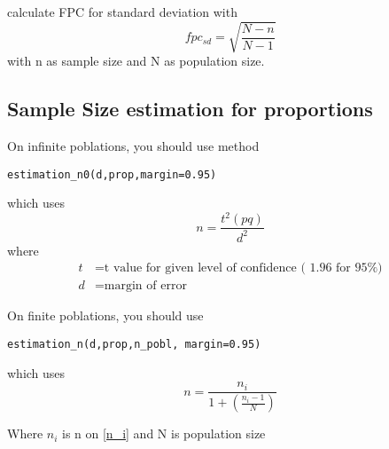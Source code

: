 calculate FPC for standard deviation with 
\begin{equation}
fpc_{sd} = \sqrt{\frac{N-n} {N-1}}
\label{fpc}
\end{equation}
with n  as sample size and N as population size.

\subsection{Sample Size estimation for proportions}

On infinite poblations, you should use method
\begin{verbatim}
estimation_n0(d,prop,margin=0.95)
\end{verbatim}
which uses
\begin{equation}
n = \frac{t^2(pq)}{d^2}
\label{n_i}
\end{equation}
where
\begin{align*}
t &= \text{t value for given level of confidence ( 1.96 for 95\% )}\\
d &= \text{margin of error}
\end{align*}

On finite poblations, you should use
\begin{verbatim}
estimation_n(d,prop,n_pobl, margin=0.95)
\end{verbatim}
which uses
\begin{equation}
n = \frac{n_i}{1+(\frac{n_i-1}{N})}
\end{equation}

Where $n_i$ is n on \ref{n_i} and N is population size


